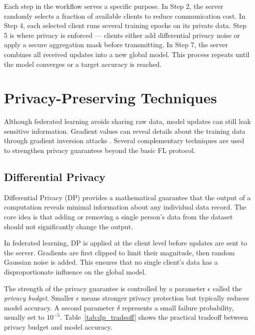\documentclass[conference]{IEEEtran}
\begin{document}
Each step in the workflow serves a specific purpose. In Step 2, the server randomly selects a fraction of available clients to reduce communication cost. In Step 4, each selected client runs several training epochs on its private data. Step 5 is where privacy is enforced — clients either add differential privacy noise or apply a secure aggregation mask before transmitting. In Step 7, the server combines all received updates into a new global model. This process repeats until the model converges or a target accuracy is reached.

\section{Privacy-Preserving Techniques}

Although federated learning avoids sharing raw data, model updates can still leak sensitive information. Gradient values can reveal details about the training data through gradient inversion attacks \cite{melis2019}. Several complementary techniques are used to strengthen privacy guarantees beyond the basic FL protocol.

\subsection{Differential Privacy}

Differential Privacy (DP) \cite{dwork2014} provides a mathematical guarantee that the output of a computation reveals minimal information about any individual data record. The core idea is that adding or removing a single person's data from the dataset should not significantly change the output.

In federated learning, DP is applied at the client level before updates are sent to the server. Gradients are first clipped to limit their magnitude, then random Gaussian noise is added. This ensures that no single client's data has a disproportionate influence on the global model.

The strength of the privacy guarantee is controlled by a parameter $\epsilon$ called the \emph{privacy budget}. Smaller $\epsilon$ means stronger privacy protection but typically reduces model accuracy. A second parameter $\delta$ represents a small failure probability, usually set to $10^{-5}$. Table~\ref{tab:dp_tradeoff} shows the practical tradeoff between privacy budget and model accuracy.
\end{document}
